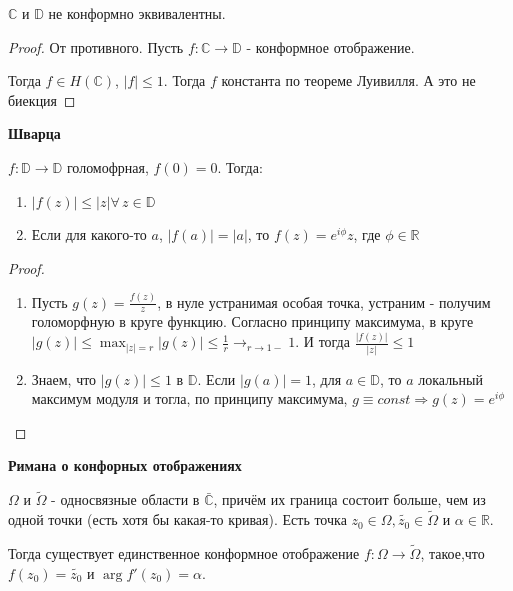 \begin{theorem}
    $\mathbb{C}$ и $\mathbb{D}$ не конформно эквивалентны.
\end{theorem}

\begin{proof}
    От противного. Пусть $f : \mathbb{C} \to \mathbb{D}$ - конформное отображение.

    Тогда $f \in H(\mathbb{C})$, $|f| \leqslant 1$. Тогда $f$ константа
    по теореме Луивилля. А это не биекция
\end{proof}

\begin{lemma}
    \textbf{Шварца}

    $f : \mathbb{D} \to \mathbb{D}$ голомофрная, $f(0) = 0$. Тогда:
    \begin{enumerate}
        \item $|f(z)| \leqslant |z| \forall \, z \in \mathbb{D}$
        \item Если для какого-то $a$, $|f(a)| = |a|$, то $f(z) = e^{i\phi} z$, где $\phi \in \mathbb{R}$
    \end{enumerate}
\end{lemma}

\begin{proof}
    \begin{enumerate}
        \item {
            Пусть $g(z) = \frac{f(z)}{z}$, в нуле устранимая особая точка, устраним - получим голоморфную в круге функцию.
            Согласно принципу максимума, в круге $|g(z)| \leqslant \max_{|z| = r} |g(z)| \leqslant \frac{1}{r} \rightarrow_{r \to 1-} 1$.
            И тогда $\frac{|f(z)|}{|z|} \leqslant 1$
        }
        \item {
            Знаем, что $|g(z)| \leqslant 1$ в $\mathbb{D}$. Если $|g(a)| = 1$, для $a \in \mathbb{D}$, то
            $a$ локальный максимум модуля и тогла, по принципу максимума, $g \equiv const \Rightarrow g(z) = e^{i\phi}$
        }
    \end{enumerate}

\end{proof}

\begin{theorem}
    \textbf{Римана о конфорных отображениях}

    $\Omega$ и $\tilde{\Omega}$ - односвязные области в $\bar{\mathbb{C}}$, причём их
    граница состоит больше, чем из одной точки (есть хотя бы какая-то кривая).
    Есть точка $z_0 \in \Omega, \tilde{z_0} \in \tilde{\Omega}$ и $\alpha \in \mathbb{R}$.

    Тогда существует единственное конформное отображение $f : \Omega \to \tilde{\Omega}$, такое,что
    $f(z_0) = \tilde{z_0}$ и $\arg f'(z_0) = \alpha$.
\end{theorem}

